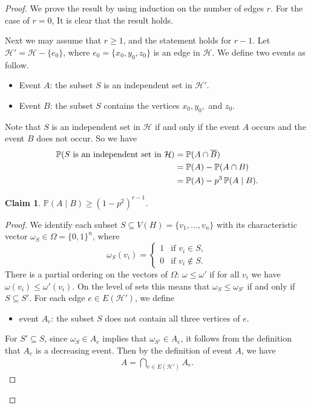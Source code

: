 \documentclass[11pt,a4paper]{article}
\newcommand{\cH}{\mathcal{H}}
\newtheorem{claim}{Claim}
\begin{document}
\begin{proof}
We prove the result by using induction on the number of edges $r$.
For the case of $r = 0$, It is clear that the result holds. 

Next we may assume that $r\ge 1$, and the statement holds for $r-1$. 
 Let $\cH'= \cH -\{e_0\}$, where  $e_0=\{x_0,y_0,z_0\}$ is an edge in $ \cH$.
We  define two events as follow.
\begin{itemize}
\item Event $A$: the subset $S$  is an independent set in $\cH'$.
\item Event $B$: the subset $S$ contains the vertices $x_0,y_0,$ and $z_0$.
\end{itemize}
Note that $S$ is an independent set in $\cH$ if and only if the event $A$ occurs and the event $B$ does not occur. So we have
\begin{align}\label{S-ind}
\mathbb P(S \text{ is an independent set in } \cH)&=\mathbb P(A\cap \overline{B})\notag\\
&=\mathbb P(A)-\mathbb P(A\cap B)\notag\\
&=\mathbb P(A)-p^3\,\mathbb P(A\mid B).
\end{align}

\begin{claim}\label{cl:condtiona}
$\mathbb{P}(A\mid B)\ge (1-p^2)^{r-1}$.
\end{claim}

\begin{proof}
We identify each subset $S\subseteq V(H)=\{v_1,\dots,v_n\}$ with its characteristic vector
$\omega_S\in\Omega=\{0,1\}^n$, where
\[
\omega_S(v_i)=
\begin{cases}
1 & \text{if } v_i\in S,\\
0 & \text{if } v_i\notin S.
\end{cases}
\]
There is a partial ordering on the vectors of $\Omega$:  $\omega\le \omega'$ if for all $v_i$ we have 
$\omega(v_i)\le \omega'(v_i)$. On the level of sets this  means that $\omega_S\le \omega_{S'}$ if and only if $S\subseteq S'$. 
For each edge $e\in E(\cH')$, we define
\begin{itemize}
\item event $A_e$: the subset $S$  does not contain all three vertices of $e$.
\end{itemize}
For  $S'\subseteq S$, since $\omega_S \in A_e$   implies that $\omega_{S'} \in A_e$, it follows from the definition that $A_e$ is a decreasing event. Then by the definition of event $A$, we have 
\begin{align}\label{AAe}
A=\bigcap_{e\in E(\cH')}A_e.
\end{align}


\end{proof}
\end{proof}
\end{document}
